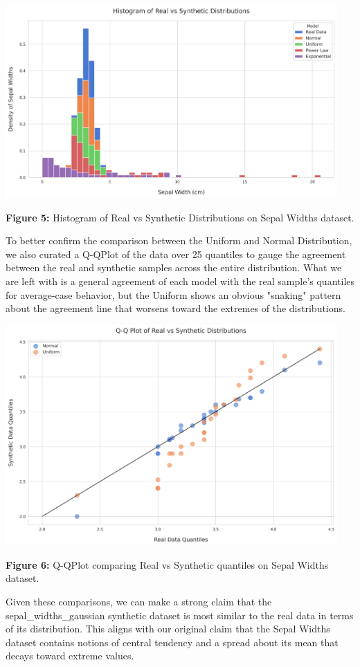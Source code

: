 \begin{center}
  \includegraphics[width=0.95\textwidth]{figures/normal/histogram.png}
  
  \textbf{Figure 5:} Histogram of Real vs Synthetic Distributions on Sepal Widths dataset.
\end{center}

To better confirm the comparison between the Uniform and Normal Distribution, we also curated a Q-QPlot of the data over 25 quantiles to gauge the agreement between the real and synthetic samples across the entire distribution. What we are left with is a general agreement of each model with the real sample's quantiles for average-case behavior, but the Uniform shows an obvious "snaking" pattern about the agreement line that worsens toward the extremes of the distributions.\\ 

\begin{center}
  \includegraphics[width=0.95\textwidth]{figures/normal/qqplot.png}
  
  \textbf{Figure 6:} Q-QPlot comparing Real vs Synthetic quantiles on Sepal Widths dataset.
\end{center}

Given these comparisons, we can make a strong claim that the sepal\_widths\_gaussian synthetic dataset is most similar to the real data in terms of its distribution. This aligns with our original claim that the Sepal Widths dataset contains notions of central tendency and a spread about its mean that decays toward extreme values.
\newpage
